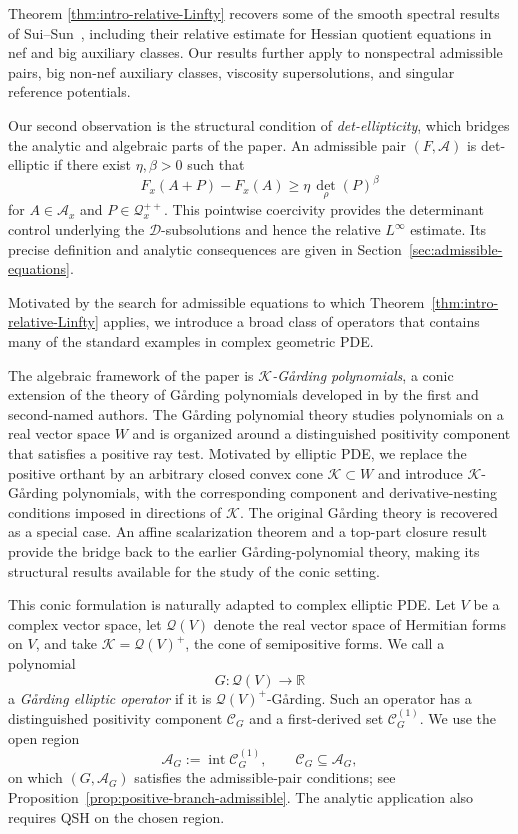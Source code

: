 \documentclass[oneside,english,letterpaper]{amsart}
\numberwithin{equation}{section}
\theoremstyle{plain}
\theoremstyle{definition}
\theoremstyle{remark}
\newcommand{\gar}{\ifmmode\mathrm{G\mathring{a}rding}\else G{\aa}rding\fi}
\begin{document}
Theorem \ref{thm:intro-relative-Linfty} recovers some of the smooth spectral results of
Sui--Sun~\cite{MR4567566}, including their relative estimate for
Hessian quotient equations in nef and big auxiliary classes.
Our results further apply to nonspectral admissible pairs, big non-nef
auxiliary classes, viscosity supersolutions, and singular
reference potentials.


Our second observation is the structural condition of
\emph{det-ellipticity}, which bridges the analytic and algebraic parts of
the paper.  An admissible pair $(F,\mathcal A)$ is det-elliptic if there
exist $\eta,\beta>0$ such that
$$
F_x(A+P)-F_x(A)\geq\eta\,\det_\rho(P)^\beta
$$
for $A\in\mathcal A_x$ and $P\in\mathcal Q_x^{++}$.  This pointwise
coercivity provides the determinant control underlying the
$\mathcal D$-subsolutions and hence the relative $L^\infty$ estimate.
Its precise definition and analytic consequences are given in Section~\ref{sec:admissible-equations}.

Motivated by the search for admissible equations to which
Theorem~\ref{thm:intro-relative-Linfty} applies, we introduce a broad class of operators that
contains many of the standard examples in complex geometric PDE.

The algebraic framework  of the paper is \emph{$\mathcal K$-G{\aa}rding polynomials},    a conic
extension of the theory of G{\aa}rding polynomials developed in \cite{Fang-MaGard} by the first and second-named authors.   The \gar{} polynomial theory studies
polynomials on a real vector space $W$  and is organized around a
distinguished positivity component that satisfies a positive ray test.
Motivated by elliptic PDE, we replace the positive orthant by an arbitrary
closed convex cone $\mathcal K\subset W$ and introduce
$\mathcal K$-G{\aa}rding polynomials, with the corresponding component and
derivative-nesting conditions imposed in directions of $\mathcal K$.
The original  \gar{} theory is recovered as a special case.  An affine scalarization
theorem and a top-part closure result provide the bridge back to the earlier G{\aa}rding-polynomial
theory, making its structural results available for the study of the conic
setting.

This conic formulation is naturally adapted to complex elliptic PDE.
Let $V$ be a complex vector space, let $\mathcal Q(V)$ denote the real
vector space of Hermitian forms on $V$, and take
$\mathcal K=\mathcal Q(V)^+$, the cone of semipositive forms.  We call a
polynomial
\[
G:\mathcal Q(V)\longrightarrow\mathbb R
\]
a \emph{G{\aa}rding elliptic operator} if it is
$\mathcal Q(V)^+$-G{\aa}rding.  
Such an operator has a distinguished positivity component
$\mathcal C_G$ and a first-derived set $\mathcal C_G^{(1)}$.
We use the open region
\[
\mathcal A_G:=\operatorname{int}\mathcal C_G^{(1)},
\qquad \mathcal C_G\subseteq\mathcal A_G,
\]
on which $(G,\mathcal A_G)$ satisfies the admissible-pair conditions;
see Proposition~\ref{prop:positive-branch-admissible}.
The analytic application also requires QSH on the chosen region.
\end{document}
